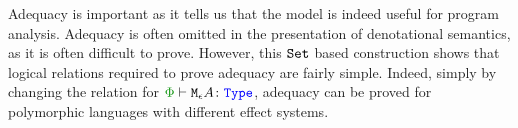 Adequacy is important as it tells us that the model is indeed useful for program analysis. Adequacy is often omitted in the presentation of denotational semantics, as it is often difficult to prove. However, this $\texttt{Set}$ based construction shows that logical relations required to prove adequacy are fairly simple. Indeed, simply by changing the relation for $\wellformedt{\P}{\mea}$, adequacy can be proved for polymorphic languages with different effect systems.